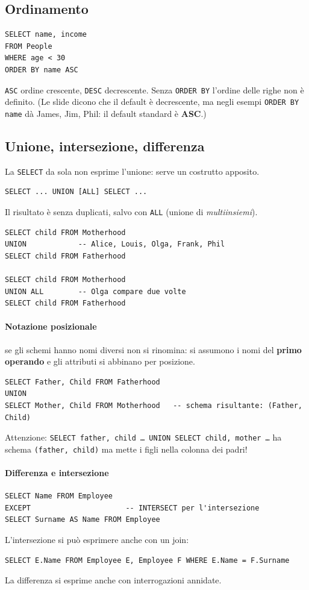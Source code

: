 \documentclass[a4paper,12pt]{article}
\begin{document}
\subsection{Ordinamento}

\begin{verbatim}
SELECT name, income
FROM People
WHERE age < 30
ORDER BY name ASC
\end{verbatim}
\texttt{ASC} ordine crescente, \texttt{DESC} decrescente. Senza
\texttt{ORDER BY} l'ordine delle righe non è definito. (Le slide dicono che il
default è decrescente, ma negli esempi \texttt{ORDER BY name} dà James, Jim,
Phil: il default standard è \textbf{ASC}.)

\subsection{Unione, intersezione, differenza}

La \texttt{SELECT} da sola non esprime l'unione: serve un costrutto apposito.
\begin{verbatim}
SELECT ... UNION [ALL] SELECT ...
\end{verbatim}
Il risultato è senza duplicati, salvo con \texttt{ALL} (unione di
\emph{multiinsiemi}).
\begin{verbatim}
SELECT child FROM Motherhood
UNION            -- Alice, Louis, Olga, Frank, Phil
SELECT child FROM Fatherhood

SELECT child FROM Motherhood
UNION ALL        -- Olga compare due volte
SELECT child FROM Fatherhood
\end{verbatim}

\paragraph{Notazione posizionale} se gli schemi hanno nomi diversi non si
rinomina: si assumono i nomi del \textbf{primo operando} e gli attributi si
abbinano per posizione.
\begin{verbatim}
SELECT Father, Child FROM Fatherhood
UNION
SELECT Mother, Child FROM Motherhood   -- schema risultante: (Father, Child)
\end{verbatim}
Attenzione: \texttt{SELECT father, child \dots\ UNION SELECT child, mother
\dots} ha schema \texttt{(father, child)} ma mette i figli nella colonna dei
padri!

\paragraph{Differenza e intersezione}
\begin{verbatim}
SELECT Name FROM Employee
EXCEPT                      -- INTERSECT per l'intersezione
SELECT Surname AS Name FROM Employee
\end{verbatim}
L'intersezione si può esprimere anche con un join:
\begin{verbatim}
SELECT E.Name FROM Employee E, Employee F WHERE E.Name = F.Surname
\end{verbatim}
La differenza si esprime anche con interrogazioni annidate.
\end{document}
